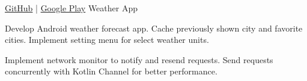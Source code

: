 \begin{cventries}
    \cventry
    {\href{https://github.com/neronguyenvn/clean-architecture-weather-app}{GitHub} | \href{https://play.google.com/store/apps/details?id=com.nero.weatherjourney}{Google Play}}
    {Weather App}
    {}{}
    {
        \begin{cvitems}
            \item {
                Develop Android weather forecast app.
                Cache previously shown city and favorite cities.
                Implement setting menu for select weather units.
            }
            \item {
                Implement network monitor to notify and resend requests.
                Send requests concurrently with Kotlin Channel for better performance.
            }
        \end{cvitems}
    }
\end{cventries}
